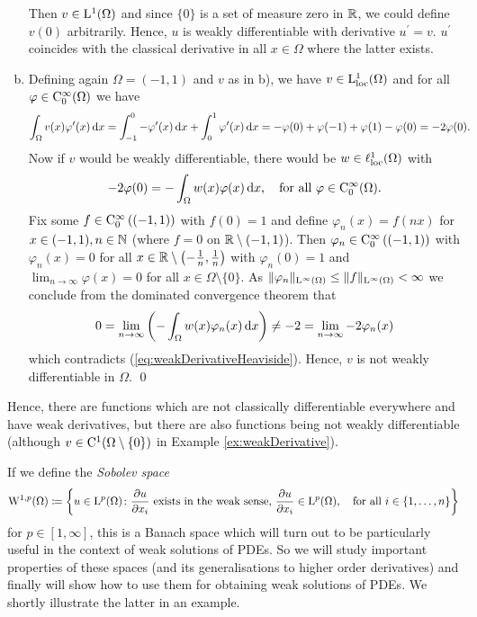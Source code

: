 \begin{ex}
\begin{enumerate}[a)]
      Then $v \in \mathrm{L}^1(\Omega)$ and since $\{0\}$ is a set of measure zero in $\mathbb{R}$, we could define $v(0)$ arbitrarily.
      Hence, $u$ is weakly differentiable with derivative $u^\prime = v$.
      $u^\prime$ coincides with the classical derivative in all $x \in \Omega$ where the latter exists.
    \item Defining again $\Omega = (-1,1)$ and $v$ as in b), we have $v \in \mathrm{L}_{\operatorname{loc}}^1(\Omega)$ and for all $\varphi \in \mathrm{C}_0^\infty(\Omega)$ we have
      \begin{align*}
      \int_\Omega v(x) \varphi^\prime(x) \, {\operatorname{d}\!{x}} 
      &= \int_{-1}^0 - \varphi^\prime(x) \, {\operatorname{d}\!{x}} + \int_0^1 \varphi^\prime(x) \, {\operatorname{d}\!{x}} 
      = - \varphi(0) + \varphi(-1) + \varphi(1) - \varphi(0) = -2\varphi(0).
      \end{align*}
      Now if $v$ would be weakly differentiable, there would be $w \in \ell_{\operatorname{loc}}^1(\Omega)$ with
      \begin{equation}
        \label{eq:weakDerivativeHeaviside}
        -2\varphi(0) = -\int_\Omega w(x) \varphi(x) \, {\operatorname{d}\!{x}}, \quad\text{for all } \varphi \in \mathrm{C}_0^\infty(\Omega).
      \end{equation}
      Fix some $f \in \mathrm{C}_0^\infty\left((-1,1)\right)$ with $f(0) = 1$ and define $\varphi_n(x) = f(nx)$ for $x \in (-1,1), n \in \mathbb{N}$ (where $f = 0$ on $\mathbb{R} \setminus(-1,1)$).
      Then $\varphi_n \in \mathrm{C}_0^\infty\left( (-1,1)\right)$ with $\varphi_n(x) = 0$ for all $x \in \mathbb{R} \setminus\left(-\frac{1}{n}, \frac{1}{n} \right)$ with $\varphi_n(0) = 1$ and $\lim_{n \to \infty} \varphi(x) = 0$ for all $x \in \Omega \setminus \{0\}$. As $\|\varphi_n\|_{\mathrm{L}^\infty(\Omega)} \leq \|f\|_{\mathrm{L}^\infty(\Omega)} < \infty$ we conclude from the dominated convergence theorem that
      $$
      0 = \lim_{n \to \infty} \left( -\int_\Omega w(x) \varphi_n(x) \, {\operatorname{d}\!{x}} \right) \neq -2 = \lim_{n \to \infty} - 2\varphi_n(x)
      $$
      which contradicts (\ref{eq:weakDerivativeHeaviside}).
      Hence, $v$ is not weakly differentiable in $\Omega$.
  \qed
  \end{enumerate}
\end{ex}

Hence, there are functions which are not classically differentiable everywhere and have weak derivatives, but there are also functions being not weakly differentiable (although $v \in  \mathrm{C}^1(\Omega\setminus\{0\})$ in Example \ref{ex:weakDerivative}).

If we define the \emph{Sobolev space}
$$
\mathrm{W}^{1,p}(\Omega) \coloneqq \left\{u \in \mathrm{L}^p(\Omega) \colon \frac{\partial u}{\partial x_i} \text{ exists in the weak sense, } \frac{\partial u}{\partial x_i} \in \mathrm{L}^p(\Omega), \quad \text{for all } i \in \{1,\dots,n\}\right\}
$$
for $p \in [1,\infty]$, this is a Banach space which will turn out to be particularly useful in the context of weak solutions of PDEs. 
So we will study important properties of these spaces (and its generalisations to higher order derivatives) and finally will show how to use them for obtaining weak solutions of PDEs.
We shortly illustrate the latter in an example.

